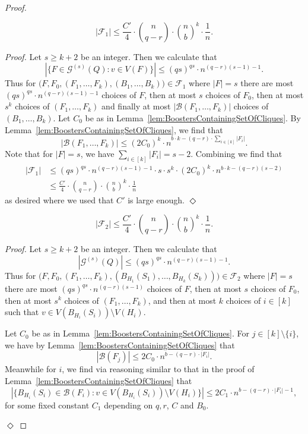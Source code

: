 \documentclass[11pt]{article}
\newcommand{\mc}[1]{\mathcal{#1}}
\newcounter{i}
\theoremstyle{plain}
\newenvironment{proofclaim}[1][]%
{\noindent \emph{Proof.} {}{#1}{}}{\hfill
	$\Diamond$\vspace{1em}}
\renewcommand{\theclaim}{\thetheorem.\arabic{claim}}
\newenvironment{nonlateproof}[1]
 {%
  \renewcommand{\theclaim}{\ref{#1}.\arabic{claim}}%
  \begin{proof}%
 }
 {\end{proof}}
\theoremstyle{plain} %
\theoremstyle{definition}
\begin{document}
\begin{nonlateproof}{lem:UncommonDegree}
\begin{claim}
$$|\mc{F}_1| \le \frac{C'}{4} \cdot \binom{n}{q-r}\cdot \binom{n}{b}^k \cdot \frac{1}{n}.$$    
\end{claim}
\begin{proofclaim}
Let $s\ge k+2$ be an integer. Then we calculate that
$$|\{F\in \mc{G}^{(s)}(Q): v\in V(F)\}| \le (qs)^{qs} \cdot n^{(q-r)(s-1)-1}.$$
Thus for $\bigg(F, F_0, (F_1,\dots, F_k), (B_1,\ldots, B_k)\bigg)\in \mc{F}_1$ where $|F|=s$ there are most $(qs)^{qs} \cdot n^{(q-r)(s-1)-1}$ choices of $F$, then at most $s$ choices of $F_0$, then at most $s^k$ choices of $(F_1,\dots, F_k)$ and finally at most $|\mc{B}(F_1,\ldots, F_k)|$ choices of $(B_1,\ldots, B_k)$. Let $C_0$ be as in Lemma~\ref{lem:BoostersContainingSetOfCliques}. By Lemma~\ref{lem:BoostersContainingSetOfCliques}, we find that
$$|\mc{B}(F_1,\ldots, F_{k})| \le (2C_0)^{k}\cdot n^{b\cdot k-(q-r)\cdot \sum_{i\in [k]} |F_i|}.$$
Note that for $|F|=s$, we have $\sum_{i\in [k]} |F_i|=s-2$. Combining we find that
\begin{align*}
|\mc{F}_1| &\le (qs)^{qs} \cdot n^{(q-r)(s-1)-1}\cdot s \cdot s^k \cdot (2C_0)^{k}\cdot n^{b\cdot k-(q-r)(s-2)} \\
&\le \frac{C'}{4} \cdot \binom{n}{q-r}\cdot \binom{n}{b}^k \cdot \frac{1}{n}
\end{align*}
as desired where we used that $C'$ is large enough.
\end{proofclaim}

\begin{claim}
$$|\mc{F}_2| \le \frac{C'}{4} \cdot \binom{n}{q-r}\cdot \binom{n}{b}^k \cdot \frac{1}{n}.$$    
\end{claim}
\begin{proofclaim}
Let $s\ge k+2$ be an integer. Then we calculate that
$$|\mc{G}^{(s)}(Q)| \le (qs)^{qs} \cdot n^{(q-r)(s-1)-1}.$$
Thus for $\bigg(F, F_0, (F_1,\dots, F_k), (B_{H_1}(S_1),\ldots, B_{H_k}(S_k))\bigg)\in \mc{F}_2$ where $|F|=s$ there are most $(qs)^{qs} \cdot n^{(q-r)(s-1)}$ choices of $F$, then at most $s$ choices of $F_0$, then at most $s^k$ choices of $(F_1,\dots, F_k)$, and then at most $k$ choices of $i\in [k]$ such that $v\in V\left(B_{H_i}(S_i)\right)\setminus V(H_i)$. 

Let $C_0$ be as in Lemma~\ref{lem:BoostersContainingSetOfCliques}. For $j\in [k]\setminus \{i\}$, we have by Lemma~\ref{lem:BoostersContainingSetOfCliques} that
$$|\mc{B}(F_j)| \le 2C_0\cdot n^{b-(q-r)\cdot |F_i|}.$$
Meanwhile for $i$, we find via reasoning similar to that in the proof of Lemma~\ref{lem:BoostersContainingSetOfCliques} that
$$|\{B_{H_i}(S_i)\in \mc{B}(F_i): v\in V\left(B_{H_i}(S_i)\right)\setminus V(H_i)\}| \le 2C_1\cdot n^{b-(q-r)\cdot |F_i|-1},$$
for some fixed constant $C_1$ depending on $q,r$, $C$ and $B_0$. 


\end{proofclaim}
\end{nonlateproof}
\end{document}
